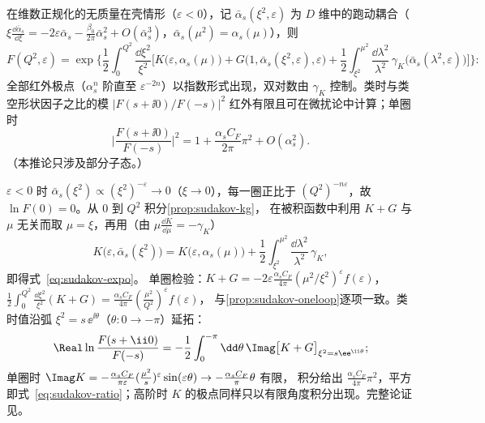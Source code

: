 \begin{corollary}\label{cor:sudakov-exponentiation}
在维数正规化的无质量在壳情形（$\varepsilon<0$），记 $\bar\alpha_s(\xi^2,\varepsilon)$ 为 $D$ 维中的跑动耦合（$\xi\frac{\dd\bar\alpha_s}{\dd\xi}=-2\varepsilon\bar\alpha_s-\frac{\beta_0}{2\pi}\bar\alpha_s^2+O(\bar\alpha_s^3)$，$\bar\alpha_s(\mu^2)=\alpha_s(\mu)$），则
\begin{equation}\label{eq:sudakov-expo}
F(Q^2,\varepsilon)=\exp\Big\{\frac12\int_0^{Q^2}\frac{\dd\xi^2}{\xi^2}\Big[K\big(\varepsilon,\alpha_s(\mu)\big)+G\big(1,\bar\alpha_s(\xi^2,\varepsilon),\varepsilon\big)
+\frac12\int_{\xi^2}^{\mu^2}\frac{\dd\lambda^2}{\lambda^2}\,\gamma_K\big(\bar\alpha_s(\lambda^2,\varepsilon)\big)\Big]\Big\}:
\end{equation}
全部红外极点（$\alpha_s^n$ 阶直至 $\varepsilon^{-2n}$）以指数形式出现，双对数由 $\gamma_K$ 控制。类时与类空形状因子之比的模
$|F(s+\ii0)/F(-s)|^2$ 红外有限且可在微扰论中计算\cite{Magnea:1990zb}；单圈时
\begin{equation}\label{eq:sudakov-ratio}
\Big|\frac{F(s+\ii0)}{F(-s)}\Big|^2=1+\frac{\alpha_sC_F}{2\pi}\pi^2+O(\alpha_s^2).
\end{equation}
（本推论只涉及部分子态。）
\end{corollary}

\begin{proofsketch}
$\varepsilon<0$ 时 $\bar\alpha_s(\xi^2)\propto(\xi^2)^{-\varepsilon}\to0$（$\xi\to0$），每一圈正比于 $(Q^2)^{-n\varepsilon}$，故 $\ln F(0)=0$。从 $0$ 到 $Q^2$ 积分\cref{prop:sudakov-kg}，
在被积函数中利用 $K+G$ 与 $\mu$ 无关而取 $\mu=\xi$，再用（由 $\mu\frac{\dd K}{\dd\mu}=-\gamma_K$）
\[
K\big(\varepsilon,\bar\alpha_s(\xi^2)\big)=K\big(\varepsilon,\alpha_s(\mu)\big)+\frac12\int_{\xi^2}^{\mu^2}\frac{\dd\lambda^2}{\lambda^2}\,\gamma_K ,
\]
即得式~\eqref{eq:sudakov-expo}。
单圈检验：$K+G=-2\varepsilon\frac{\alpha_sC_F}{4\pi}(\mu^2/\xi^2)^\varepsilon f(\varepsilon)$，$\frac12\int_0^{Q^2}\frac{\dd\xi^2}{\xi^2}(K+G)=\frac{\alpha_sC_F}{4\pi}(\frac{\mu^2}{Q^2})^\varepsilon f(\varepsilon)$，
与\cref{prop:sudakov-oneloop}逐项一致。类时值沿弧 $\xi^2=s\,\ee^{\ii\theta}$（$\theta:0\to-\pi$）延拓：%
\[
\Real\ln\frac{F(s+\ii0)}{F(-s)}=-\frac12\int_0^{-\pi}\dd\theta\,\Imag\big[K+G\big]_{\xi^2=s\ee^{\ii\theta}} ;
\]
单圈时 $\Imag K=-\frac{\alpha_sC_F}{\pi\varepsilon}(\frac{\mu^2}{s})^\varepsilon\sin(\varepsilon\theta)\to-\frac{\alpha_sC_F}\pi\theta$ 有限，
积分给出 $\frac{\alpha_sC_F}{4\pi}\pi^2$，平方即式~\eqref{eq:sudakov-ratio}；高阶时 $K$ 的极点同样只以有限角度积分出现。完整论证见\cite{Magnea:1990zb}。
\end{proofsketch}

